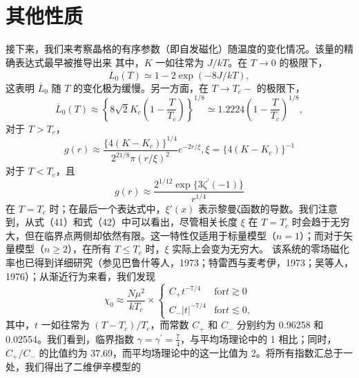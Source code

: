 \section{其他性质}\label{ux5176ux4ed6ux6027ux8d28}
接下来，我们来考察晶格的有序参数（即自发磁化）随温度的变化情况。该量的精确表达式最早被推导出来
其中，\(K\) 一如往常为 \(J/kT\)。在 \(T \rightarrow 0\) 的极限下，
\begin{equation}\tag{13.1.110}\label{eq:13.1.110}
\overline { { L } } _ { 0 } ( T ) \simeq 1 - 2 \exp ( - 8 J / k T ) ,
\end{equation}
这表明 \(\overline{L}_{0}\) 随 \(T\) 的变化极为缓慢。另一方面，在 \(T \rightarrow T_{c} -\) 的极限下，
\begin{equation}\tag{13.1.111}\label{eq:13.1.111}
\overline { { L } } _ { 0 } ( T ) \approx \left\{ 8 \sqrt { 2 } K _ { c } \left( 1 - \frac { T } { T _ { c } } \right) \right\} ^{1 / 8} \simeq 1 . 22 24 \left( 1 - \frac { T } { T _ { c } } \right) ^{1 / 8} ,
\end{equation}
对于 \(T > T_{c}\)，
\begin{equation}\tag{13.1.112}\label{eq:13.1.112}
g ( r ) \approx \frac { \{ 4 ( K - K _ { c } ) \} ^{1 / 4} } { 2 ^{21 / 8} \pi ( r / \xi ) ^{2} } e ^{- 2 r / \xi} ,  \xi = \{ 4 ( K - K _ { c } ) \} ^{- 1}
\end{equation}
对于 \(T < T_{c}\)，且
\begin{equation}\tag{13.1.113}\label{eq:13.1.113}
g ( r ) \approx \frac { 2 ^{1 / 12} \exp \{ 3 \zeta ^{\prime} ( - 1 ) \} } { r ^{1 / 4} }
\end{equation}
在 \(T=T_{c}\) 时；在最后一个表达式中，\(\xi'(x)\) 表示黎曼ζ函数的导数。我们注意到，从式（41）和式（42）中可以看出，尽管相关长度 \(\xi\) 在 \(T=T_{c}\) 时会趋于无穷大，但在临界点两侧却依然有限。这一特性仅适用于标量模型（\(n=1\)）；而对于矢量模型（\(n\geq2\)），在所有 \(T\leq T_{c}\) 时，\(\xi\) 实际上会变为无穷大。
该系统的零场磁化率也已得到详细研究（参见巴鲁什等人，1973；特雷西与麦考伊，1973；吴等人，1976）；从渐近行为来看，我们发现
\begin{equation}\tag{13.1.114}\label{eq:13.1.114}
\chi _ { 0 } \approx \frac { N \mu ^{2} } { k T _ { c } } \times \left\{ \begin{array}{ll} { C _ { + } t ^{- 7 / 4} } & { \mathrm { f o r }  t \gtrsim 0 } \\{ C _ { - } | t | ^{- 7 / 4} } & { \mathrm { f o r }  t \lesssim 0 , } \end{array} \right.
\end{equation}
其中，\(t\) 一如往常为 \((T-T_{c})/T_{c}\)，而常数 \(C_{+}\) 和 \(C_{-}\) 分别约为 0.96258 和 0.02554。我们看到，临界指数 \(\gamma=\gamma^{\prime} = \frac{7}{4}\)，与平均场理论中的 1 相比；同时，\(C_{+}/C_{-}\) 的比值约为 37.69，而平均场理论中的这一比值为 2。将所有指数汇总于一处，我们得出了二维伊辛模型的

